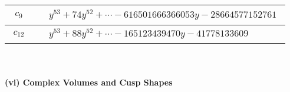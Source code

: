 \documentclass[1p]{elsarticle_modified}
\theoremstyle{definition}
\begin{document}
\begin{tabular}{m{50pt}|m{274pt}}
\hline $$\begin{aligned}c_{9}\end{aligned}$$&$\begin{aligned}
&y^{53}+74 y^{52}+\cdots-616501666366053 y-28664577152761
\end{aligned}$\\
\hline $$\begin{aligned}c_{12}\end{aligned}$$&$\begin{aligned}
&y^{53}+88 y^{52}+\cdots-165123439470 y-41778133609
\end{aligned}$\\
\hline
\end{tabular}\\~\\
\newpage\flushleft \textbf{(vi) Complex Volumes and Cusp Shapes}
\end{document}
